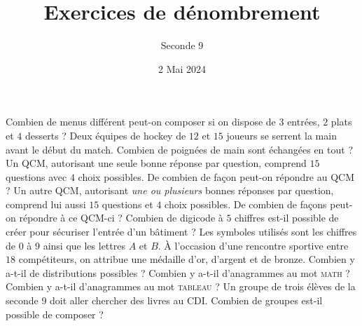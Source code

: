 \documentclass{exam}
\author{Seconde 9}
\title{Exercices de dénombrement}
\date{2 Mai 2024}
\begin{document}
\maketitle

\begin{questions}
\question Combien de menus différent peut-on composer si on dispose de $3$ entrées, $2$ plats et $4$ desserts ?
\vspace*{0.5cm}
\question Deux équipes de hockey de $12$ et $15$ joueurs se serrent la main avant le début du match. Combien de poignées de main sont échangées en tout ?
\vspace*{0.5cm}
\question Un QCM, autorisant une seule bonne réponse par question, comprend $15$ questions avec $4$ choix possibles. De combien de façon peut-on répondre au QCM ?
\vspace*{0.5cm}
\question Un autre QCM, autorisant \emph{une ou plusieurs} bonnes réponses par question, comprend lui aussi $15$ questions et $4$ choix possibles. De combien de façons peut-on répondre à ce QCM-ci ?
\vspace*{0.5cm}
\question Combien de digicode à $5$ chiffres est-il possible de créer pour sécuriser l'entrée d'un bâtiment ? Les symboles utilisés sont les chiffres de $0$ à $9$ ainsi que les lettres $A$ et $B$.
\vspace*{0.5cm}
\question À l'occasion d'une rencontre sportive entre $18$ compétiteurs, on attribue une médaille d'or, d'argent et de bronze. Combien y a-t-il de distributions possibles ?
\vspace*{0.5cm}
\question Combien y a-t-il d'anagrammes au mot \textsc{math} ?
\vspace*{0.5cm}
\question Combien y a-t-il d'anagrammes au mot \textsc{tableau} ?
\vspace*{0.5cm}
\question Un groupe de trois élèves de la seconde 9 doit aller chercher des livres au CDI. Combien de groupes est-il possible de composer ?
\end{questions}
\end{document}
